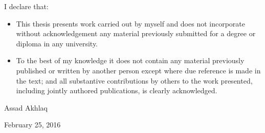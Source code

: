 I declare that:
\begin{itemize}

\item{This thesis presents work carried out by myself and does not incorporate without acknowledgement any material previously submitted for a degree or diploma in any university.}

\item{To the best of my knowledge it does not contain any material previously published or written by another person except where due reference is made in the text; and all substantive contributions by others to the work presented, including jointly authored publications, is clearly acknowledged.}

\end{itemize}

\vspace{2cm}

Assad Akhlaq \par
\setlength\parindent{24pt}February 25, 2016